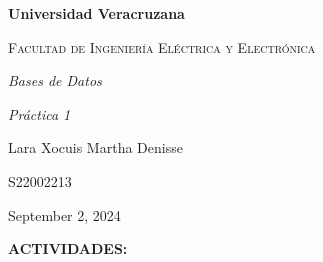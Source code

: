 \documentclass[letterpaper,12pt]{article}
\begin{document}
\thispagestyle{empty}
\newpage
\setcounter{page}{1}
\pagestyle{headings}
\begin{sloppypar} 
    \begin{titlepage}
        \hspace{2.5cm}
        {\bfseries\LARGE Universidad Veracruzana \par}
        \hspace{2cm}
        {\scshape\Large Facultad de Ingeniería Eléctrica y Electrónica \par}
        \begin{center}
            \vspace{7cm}
            {\itshape\huge Bases de Datos \par}
            {\itshape\Large Práctica 1 \par}
            {\large Lara Xocuis Martha Denisse\par}
            {\large S22002213 \par}
            \vfill
            {\Large September 2, 2024 \par}
        \end{center}
    \end{titlepage} 

\textbf{ACTIVIDADES:}

\end{sloppypar}
\end{document}
